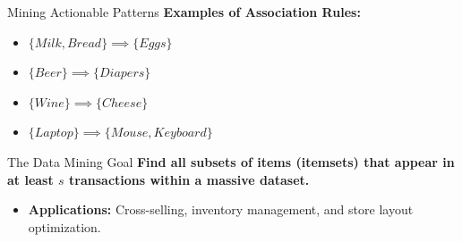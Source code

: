 \begin{frame}{Mining Actionable Patterns}
    \textbf{Examples of Association Rules:}
    \vspace{0.3cm}
    \begin{itemize}
        \item \small $\{Milk, Bread\} \implies \{Eggs\}$
        \item \small $\{Beer\} \implies \{Diapers\}$
        \item \small $\{Wine\} \implies \{Cheese\}$
        \item \small $\{Laptop\} \implies \{Mouse, Keyboard\}$
    \end{itemize}

    \vfill

    \begin{alertblock}{The Data Mining Goal}
        \centering \textbf{Find all subsets of items (itemsets) that appear in at least $s$ transactions within a massive dataset.}
    \end{alertblock}
    
    \vspace{0.4cm}
    \begin{itemize}
        \item \small \textbf{Applications:} Cross-selling, inventory management, and store layout optimization.
    \end{itemize}
\end{frame}

